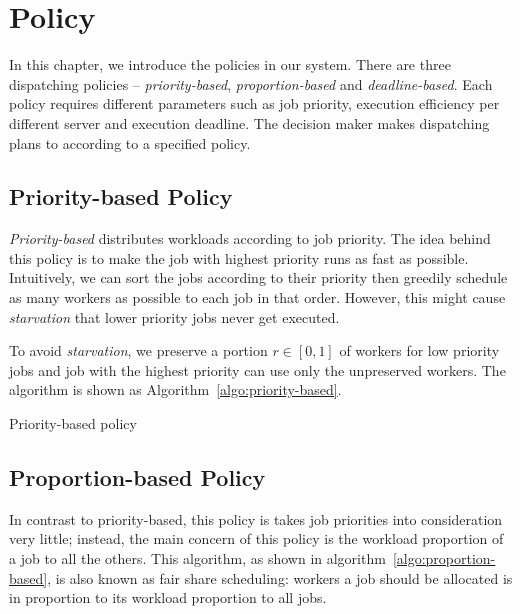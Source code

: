 \chapter{Policy}

In this chapter, we introduce the policies in our system.
There are three dispatching policies -- \emph{priority-based},
\emph{proportion-based} and \emph{deadline-based}.
Each policy requires different parameters such as job priority,
execution efficiency per different server and execution deadline.
The decision maker makes dispatching plans to according to a specified
policy.


\section{Priority-based Policy}

\emph{Priority-based} distributes workloads according to job priority. 
The idea behind this policy is to make the job with highest priority runs as
fast as possible.
Intuitively, we can sort the jobs according to their priority then greedily
schedule as many workers as possible to each job in that order.
However, this might cause \emph{starvation} that lower priority jobs never get
executed.

To avoid \emph{starvation}, we preserve a portion $r \in [0,1]$ of workers for
low priority jobs and job with the highest priority can use only the
unpreserved workers.
The algorithm is shown as Algorithm~\ref{algo:priority-based}.

\begin{algorithm}[H]
  \DontPrintSemicolon %
  
  \caption{Priority-based policy}
  \label{algo:priority-based}
\end{algorithm}

\section{Proportion-based Policy}

In contrast to priority-based, this policy is takes job priorities into
consideration very little; instead, the main concern of this policy is
the workload proportion of a job to all the others.
This algorithm, as shown in algorithm~\ref{algo:proportion-based}, is
also known as fair share scheduling: workers a job should be allocated
is in proportion to its workload proportion to all jobs. 

